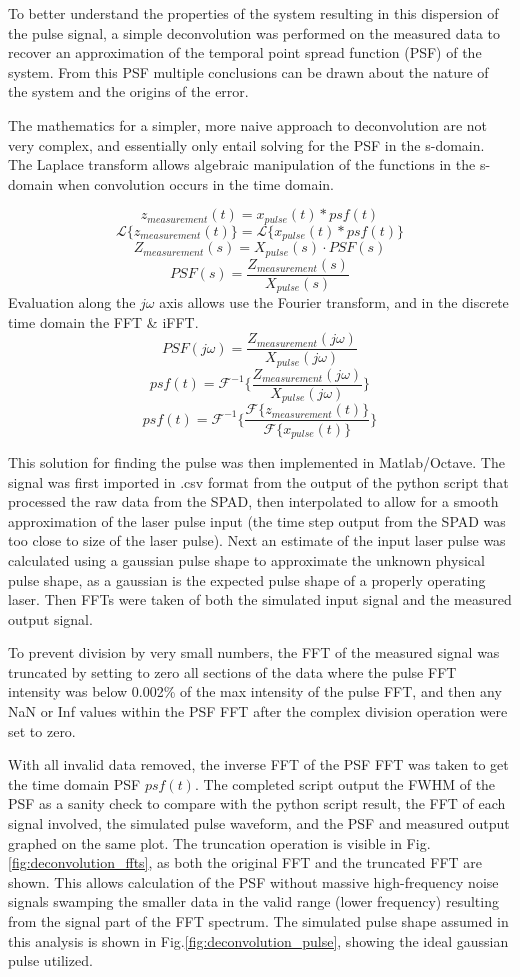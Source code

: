 \documentclass[a4paper]{article}
\begin{document}
To better understand the properties of the system resulting in this dispersion of the pulse signal, a simple deconvolution was performed on the measured data to recover an approximation of the temporal point spread function (PSF) of the system. From this PSF multiple conclusions can be drawn about the nature of the system and the origins of the error.

The mathematics for a simpler, more naive approach to deconvolution are not very complex, and essentially only entail solving for the PSF in the s-domain. The Laplace transform allows algebraic manipulation of the functions in the s-domain when convolution occurs in the time domain.

\[
z_{measurement} (t) = x_{pulse} (t) \ast psf (t)
\]
\[
\mathcal{L}\{z_{measurement} (t)\} = \mathcal{L}\{x_{pulse} (t) \ast psf (t)\}
\]
\[
Z_{measurement} (s) = X_{pulse} (s) \cdot PSF (s)
\]
\[
PSF (s) = \frac{Z_{measurement} (s)}{X_{pulse} (s)}
\]
Evaluation along the \(j\omega\) axis allows use the Fourier transform, and in the discrete time domain the FFT \& iFFT.
 \[
PSF (j\omega) = \frac{Z_{measurement} (j\omega)}{X_{pulse} (j\omega)}
\]
 \[
psf (t) = \mathcal{F}^{-1}\{\frac{Z_{measurement} (j\omega)}{X_{pulse} (j\omega)}\}
\]
\[
psf (t) = \mathcal{F}^{-1}\{\frac{\mathcal{F}\{z_{measurement} (t)\}}{\mathcal{F}\{x_{pulse} (t)\}}\}
\]

This solution for finding the pulse was then implemented in Matlab/Octave. The signal was first imported in .csv format from the output of the python script that processed the raw data from the SPAD, then interpolated to allow for a smooth approximation of the laser pulse  input (the time step output from the SPAD was too close to  size of the laser pulse). Next an estimate of the input laser pulse was calculated using a gaussian pulse shape to approximate the unknown physical pulse shape, as a gaussian is the expected pulse shape of a properly operating laser. Then FFTs were taken of both the simulated input signal and the measured output signal. 

To prevent division by very small numbers, the FFT of the measured signal was truncated by setting to zero all sections of the data where the pulse FFT intensity was below 0.002\% of the max intensity of the pulse FFT, and then any NaN or Inf values within the PSF FFT after the complex division operation were set to zero.

With all invalid data removed, the inverse FFT of the PSF FFT was taken to get the time domain PSF \(psf(t)\).  The completed script output the FWHM of the PSF as a sanity check to compare with the python script result, the FFT of each signal involved, the simulated pulse waveform, and the PSF and measured output graphed on the same plot.
The truncation operation is visible in Fig.\ref{fig:deconvolution_ffts}, as both the original FFT and the truncated FFT are shown. This allows calculation of the PSF without massive high-frequency noise signals swamping the smaller data in the valid range (lower frequency) resulting from the signal part of the FFT spectrum.
The simulated pulse shape assumed in this analysis is shown in Fig.\ref{fig:deconvolution_pulse}, showing the ideal gaussian pulse utilized.
\end{document}
